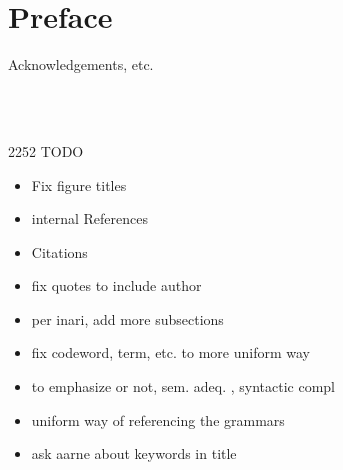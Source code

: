 \documentclass[11pt, a4paper]{article}
\begin{document}
\section*{Preface}

Acknowledgements, etc.

\thispagestyle{empty}

\newpage

\begin{spacing}{0.0}
\tableofcontents
\end{spacing}

\thispagestyle{empty}

\newpage
\setcounter{page}{1}

\begin{code}[hide]%
\>[0]\AgdaSymbol{\{-\#}\AgdaSpace{}%
\AgdaSpace{}%
\AgdaSpace{}%
\AgdaSymbol{\#-\}}\<%
\\
%
\\[\AgdaEmptyExtraSkip]%
\>[0]\AgdaSpace{}%
\AgdaSpace{}%
\<%
\end{code}

2252
TODO
\begin{itemize}
\item  Fix figure titles
\item internal References
\item Citations
\item fix quotes to include author
\item per inari, add more subsections
\item fix codeword, term, etc. to more uniform way
\item to emphasize or not, sem. adeq. , syntactic compl
\item uniform way of referencing the grammars
\item ask aarne about keywords in title
\end{itemize}

















% 




\newpage




\newpage


\end{document}
